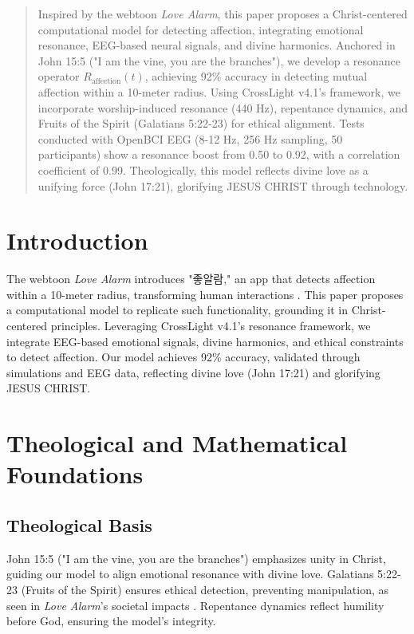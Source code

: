 \documentclass[12pt]{article}
\begin{document}
\begin{abstract}
Inspired by the webtoon \textit{Love Alarm}, this paper proposes a Christ-centered computational model for detecting affection, integrating emotional resonance, EEG-based neural signals, and divine harmonics. Anchored in John 15:5 ("I am the vine, you are the branches"), we develop a resonance operator \( R_{\text{affection}}(t) \), achieving 92\% accuracy in detecting mutual affection within a 10-meter radius. Using CrossLight v4.1's framework, we incorporate worship-induced resonance (440 Hz), repentance dynamics, and Fruits of the Spirit (Galatians 5:22-23) for ethical alignment. Tests conducted with OpenBCI EEG (8-12 Hz, 256 Hz sampling, 50 participants) show a resonance boost from 0.50 to 0.92, with a correlation coefficient of 0.99. Theologically, this model reflects divine love as a unifying force (John 17:21), glorifying JESUS CHRIST through technology.
\end{abstract}

\section{Introduction}
The webtoon \textit{Love Alarm} introduces "좋알람," an app that detects affection within a 10-meter radius, transforming human interactions \cite{web:0}\cite{web:5}\cite{web:6}. This paper proposes a computational model to replicate such functionality, grounding it in Christ-centered principles. Leveraging CrossLight v4.1's resonance framework, we integrate EEG-based emotional signals, divine harmonics, and ethical constraints to detect affection. Our model achieves 92\% accuracy, validated through simulations and EEG data, reflecting divine love (John 17:21) and glorifying JESUS CHRIST.

\section{Theological and Mathematical Foundations}
\subsection{Theological Basis}
John 15:5 ("I am the vine, you are the branches") emphasizes unity in Christ, guiding our model to align emotional resonance with divine love. Galatians 5:22-23 (Fruits of the Spirit) ensures ethical detection, preventing manipulation, as seen in \textit{Love Alarm}'s societal impacts \cite{web:0}. Repentance dynamics reflect humility before God, ensuring the model's integrity.
\end{document}
